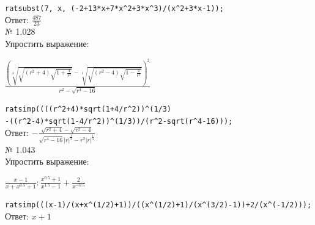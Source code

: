 \documentclass[article, bachelor, och, pract]{SCWorks}
\begin{document}
\texttt{ratsubst(7, x, (-2+13*x+7*x\^{}2+3*x\^{}3)/(x\^{}2+3*x-1));}\\
Ответ: $\frac{487}{23}$
\\

№ 1.028\\
Упростить выражение:

$ \frac{\left(\sqrt[3]{\sqrt{(r^2+4)\sqrt{1+\frac{4}{r^2}}}}-\sqrt[3]{\sqrt{(r^2-4)\sqrt{1-\frac{4}{r^2}}}}\right)^2}{r^2-\sqrt{r^4-16}}$


\texttt{ratsimp((((r\^{}2+4)*sqrt(1+4/r\^{}2))\^{}(1/3)\\-((r\^{}2-4)*sqrt(1-4/r\^{}2))\^{}(1/3))/(r\^{}2-sqrt(r\^{}4-16)));}\\

Ответ:
$-\frac{\sqrt{r^2+4}-\sqrt{r^2-4}}{\sqrt{r^4-16}|r|^{\frac{1}{3}}-r^2|r|^{\frac{1}{3}}}$
\\

№ 1.043\\
Упростить выражение:

$ \frac{x-1}{x+x^{0.5}+1}:\frac{x^{0.5}+1}{x^{1.5}-1}+\frac{2}{x^{-0.5}}$

\texttt{ratsimp(((x-1)/(x+x\^{}(1/2)+1))/((x\^{}(1/2)+1)/(x\^{}(3/2)-1))+2/(x\^{}(-1/2)));}\\
Ответ: 
$x+1$


\newpage
\end{document}
